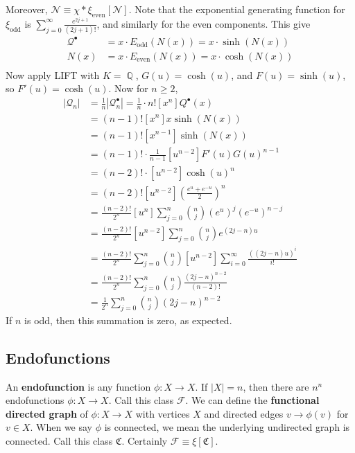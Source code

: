 \documentclass[11pt, a4paper]{memoir}
\DeclareMathOperator{\Q}{{\mathbb{Q}}}
\theoremstyle{change}
\theoremstyle{plain}
\theoremstyle{nonumberplain}
\numberwithin{equation}{section}
\begin{document}
Moreover, $\mathcal{N}\equiv\chi *\xi_{\text{even}}[\mathcal{N}]$.
Note that the exponential generating function for $\xi_{\text{odd}}$ is $\sum_{j=0}^\infty\frac{e^{2j+1}}{(2j+1)!}$, and similarly for the even components.
This give
\begin{align*}
    \mathcal{Q}^\bullet &= x\cdot E_{\text{odd}}(N(x))=x\cdot\sinh(N(x))\\
    N(x) &= x\cdot E_{\text{even}}(N(x))=x\cdot\cosh(N(x))\\
\end{align*}
Now apply LIFT with $K=\Q$, $G(u)=\cosh(u)$, and $F(u)=\sinh(u)$, so $F'(u)=\cosh(u)$.
Now for $n\geq 2$,
\begin{align*}
    |\mathcal{Q}_n|&=\frac{1}{n}|\mathcal{Q}^\bullet_n|=\frac{1}{n}\cdot n![x^n]Q^\bullet(x)\\
                   &= (n-1)![x^n]x\sinh(N(x))\\
                   &= (n-1)![x^{n-1}]\sinh(N(x))\\
                   &= (n-1)!\cdot\frac{1}{n-1}[u^{n-2}]F'(u)G(u)^{n-1}\\
                   &= (n-2)!\cdot[u^{n-2}]\cosh(u)^n\\
                   &= (n-2)![u^{n-2}]\left(\frac{e^u+e^{-u}}{2}\right)^n\\
                   &= \frac{(n-2)!}{2^n}[u^n]\sum_{j=0}^n\binom{n}{j}(e^u)^j(e^{-u})^{n-j}\\
                   &= \frac{(n-2)!}{2^n}[u^{n-2}]\sum_{j=0}^n\binom{n}{j}e^{(2j-n)u}\\
                   &= \frac{(n-2)!}{2^n}\sum_{j=0}^n\binom{n}{j}[u^{n-2}]\sum_{i=0}^\infty\frac{((2j-n)u)^i}{i!}\\
                   &= \frac{(n-2)!}{2^n}\sum_{j=0}^n\binom{n}{j}\frac{(2j-n)^{n-2}}{(n-2)!}\\
                   &= \frac{1}{2^n}\sum_{j=0}^n\binom{n}{j}(2j-n)^{n-2}
\end{align*}
If $n$ is odd, then this summation is zero, as expected.
\subsection{Endofunctions}
An \textbf{endofunction} is any function $\phi:X\to X$.
If $|X|=n$, then there are $n^n$ endofunctions $\phi:X\to X$.
Call this class $\mathcal{F}$.
We can define the \textbf{functional directed graph} of $\phi:X\to X$ with vertices $X$ and directed edges $v\to\phi(v)$ for $v\in X$.
When we say $\phi$ is connected, we mean the underlying undirected graph is connected.
Call this class $\mathfrak{C}$.
Certainly $\mathcal{F}\equiv\xi[\mathfrak{C}]$.
\end{document}
